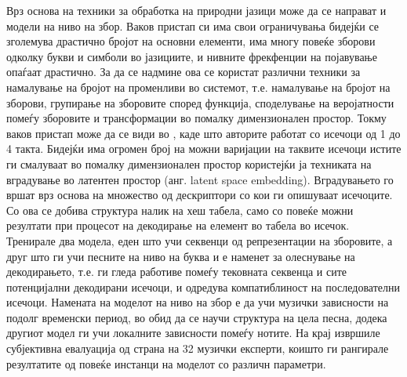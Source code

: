 Врз основа на техники за обработка на природни јазици може да се направат и модели на ниво на збор. Ваков пристап си има свои ограничувања бидејќи се зголемува драстично бројот на основни елементи, има многу повеќе зборови одколку букви и симболи во јазициите, и нивните фрекфенции на појавување опаѓаат драстично. За да се надмине ова се користат различни техники за намалување на бројот на променливи во системот, т.е. намалување на бројот на зборови, групирање на зборовите според функција, споделување на веројатности помеѓу зборовите и трансформации во помалку димензионален простор. Токму ваков пристап може да се види во \cite{Bretan2016}, каде што авторите работат со исечоци од 1 до 4 такта. Бидејќи има огромен број на можни варијации на таквите исечоци истите ги смалуваат во помалку димензионален простор користејќи ја техниката на вградување во латентен простор (анг. latent space embedding). Вградувањето го вршат врз основа на множество од дескриптори со кои ги опишуваат исечоците. Со ова се добива структура налик на хеш табела, само со повеќе можни резултати при процесот на декодирање на елемент во табела во исечок. Тренирале два модела, еден што учи секвенци од репрезентации на зборовите, а друг што ги учи песните на ниво на буква и е наменет за олеснување на декодирањето, т.е. ги гледа работиве помеѓу тековната секвенца и сите потенцијални декодирани исечоци, и одредува компатиблиност на последователни исечоци. Намената на моделот на ниво на збор е да учи музички зависности на подолг временски период, во обид да се научи структура на цела песна, додека другиот модел ги учи локалните зависности помеѓу нотите. На крај извршиле субјективна евалуација од страна на 32 музички експерти, коишто ги рангирале резултатите од повеќе инстанци на моделот со различн параметри.

